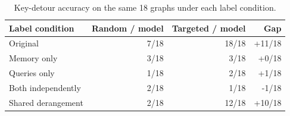 \begin{table}[H]
\centering
\caption{Key-detour accuracy on the same 18 graphs under each label condition.}
\label{tab:e004-labels}
\begin{tabular}{lrrr}
\toprule
Label condition & Random / model & Targeted / model & Gap \\
\midrule
Original & 7/18 & 18/18 & +11/18 \\
Memory only & 3/18 & 3/18 & +0/18 \\
Queries only & 1/18 & 2/18 & +1/18 \\
Both independently & 2/18 & 1/18 & -1/18 \\
Shared derangement & 2/18 & 12/18 & +10/18 \\
\bottomrule
\end{tabular}
\end{table}
